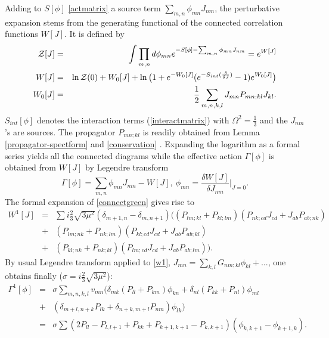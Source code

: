 \documentclass[a4paper,11pt,twoside]{article}
\numberwithin{equation}{section}
\newcommand{\eqn}[1]{(\ref{#1})}
\theoremstyle{nonumberplain}
\begin{document}
Adding to $S[\phi]$ \eqref{actmatrix} a source term $\sum_{m,n}\phi_{mn}J_{nm}$, the perturbative expansion stems from the generating functional of the connected correlation functions $W[J]$. It is defined by 
\begin{eqnarray}
{\cal{Z}}[J]&=&\int\prod_{m,n}d\phi_{mn}e^{-S[\phi]-\sum_{m,n}\phi_{mn}J_{nm}}=e^{W[J]}\label{generating-Z}\\
W[J]&=&\ln{\cal{Z}}(0)+W_0[J]+\ln\big(1+e^{-W_0[J]} ( e^{ -S_{int}(\frac{\delta}{\delta J})}   -1)e^{W_0[J]} \big)\label{connectgreen}\\
W_0[J]&=&\frac{1}{2}\sum_{m,n,k,l}J_{mn}P_{mn;kl}J_{kl}\label{connectfree}.
\end{eqnarray}
$S_{int}[\phi]$ denotes the interaction terms \eqn{interactmatrix} with $\Omega^2=\frac{1}{3}$ and the $J_{nm}$'s are sources. The propagator  $P_{mn;kl}$ is readily obtained from Lemma \ref{propagator-spectform} and \eqref{conservation} . Expanding the logarithm as a formal series yields all the connected diagrams while the effective action $\Gamma[\phi]$ is  obtained from $W[J]$ by Legendre transform
\begin{equation}
\Gamma[\phi]=\sum_{m,n}\phi_{mn}J_{nm}-W[J],\ \phi_{mn}=\frac{\delta W[J]}{\delta J_{nm}}\vert_{J=0}\label{effectiveaction}.
\end{equation}
The formal expansion of \eqref{connectgreen} gives rise to
\begin{eqnarray}
W^{1}[J]&=& \sum i\frac{2}{3}{\sqrt{3\mu^2}}(\delta_{m+1,n}-\delta_{m,n+1})\big((P_{lm;kl}+P_{kl;lm})(P_{nk;cd}J_{cd}+J_{ab}P_{ab;nk})\nonumber\\
&+&(P_{lm;nk}+P_{nk;lm})(P_{kl;cd}J_{cd}+J_{ab}P_{ab;kl})\nonumber\\
&+&(P_{kl;nk}+P_{nk;kl})(P_{lm;cd}J_{cd}+J_{ab}P_{ab;lm}) \big).\label{w1}
\end{eqnarray}
By usual Legendre transform applied to \eqref{w1}, $J_{mn}=\sum_{k,l}G_{nm;kl}\phi_{kl}+...$, one obtains finally ($\sigma=i\frac{2}{3}{\sqrt{3\mu^2}}$):
\begin{eqnarray}
\Gamma^1[\phi]&=&\sigma\sum_{m,n,k,l} v_{mn}\big(\delta_{mk}(P_{ll}+P_{km})\phi_{kn} +\delta_{nl}(P_{kk}+P_{nl})\phi_{ml}\nonumber\\
&+&(\delta_{m+l,n+k}P_{lk}+\delta_{n+k,m+l}P_{nm})\phi_{lk} \big)\nonumber\\
&=&\sigma\sum(2P_{ll}-P_{l,l+1}+P_{kk}+P_{k+1,k+1}-P_{k,k+1})(\phi_{k,k+1}-\phi_{k+1,k})\label{cgamma1}.
\end{eqnarray}
\end{document}

